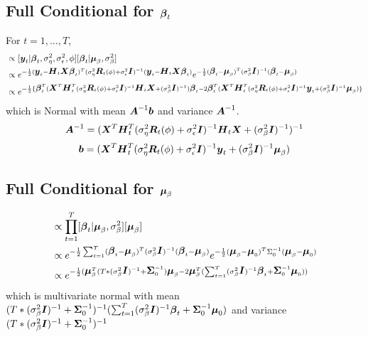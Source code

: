 \documentclass[fleqn]{article}
\def\bm#1{\mbox{\boldmath $#1$}}
\begin{document}
\subsection{Full Conditional for $\bm{\beta}_t$}
%
For $t = 1, \ldots, T$,
\begin{align*}
[\bm{\beta}_t | \cdot] & \propto [\bm{y}_t | \bm{\beta}_t, \sigma^2_\eta, \sigma^2_\epsilon, \phi] [\bm{\beta}_t | \bm{\mu}_\beta, \sigma^2_\beta]\\
%
& \propto e^{ - \frac{1} {2} (\bm{y}_t - \bm{H}_t \bm{X} \bm{\beta}_t)^T (\sigma^2_\eta \bm{R}_t(\phi) + \sigma^2_\epsilon \bm{I})^{ - 1} (\bm{y}_t - \bm{H}_t \bm{X} \bm{\beta}_t)} e^{ - \frac{1} {2} (\bm{\beta}_t - \bm{\mu}_\beta)^T (\sigma^2_{\beta} \bm{I})^{ - 1} (\bm{\beta}_t - \bm{\mu}_\beta)}\\
%
& \propto e^{ - \frac{1} {2} \{\bm{\beta}_t^T (\bm{X}^T \bm{H}_t^T (\sigma^2_\eta \bm{R}_t(\phi) + \sigma^2_\epsilon \bm{I})^{ - 1} \bm{H}_t \bm{X} + (\sigma^2_{\beta} \bm{I})^{ - 1}) \bm{\beta}_t - 2 \bm{\beta}_t^T (\bm{X}^T \bm{H}_t^T (\sigma^2_\eta \bm{R}_t(\phi) + \sigma^2_\epsilon \bm{I})^{ - 1} \bm{y}_t + (\sigma^2_{\beta} \bm{I})^{ - 1} \bm{\mu}_\beta) \} }
\end{align*}
%
which is Normal with mean $ \bm{A}^{ - 1} \bm{b}$ and variance $\bm{A}^{ - 1}$.
\begin{align*}
  \bm{A}^{ - 1} & = (\bm{X}^T \bm{H}_t^T (\sigma^2_\eta \bm{R}_t(\phi) + \sigma^2_\epsilon \bm{I})^{ - 1} \bm{H}_t \bm{X} + (\sigma^2_{\beta} \bm{I})^{ - 1})^{ - 1}\\
\end{align*}
\begin{align*}
  \bm{b} & = (\bm{X}^T \bm{H}_t^T (\sigma^2_\eta \bm{R}_t(\phi) + \sigma^2_\epsilon \bm{I})^{ - 1} \bm{y}_t + (\sigma^2_{\beta} \bm{I})^{ - 1} \bm{\mu}_\beta)\\
\end{align*}
%
\subsection{Full Conditional for $\bm{\mu}_\beta$}
%
\begin{align*}
[\bm{\mu}_\beta | \cdot] & \propto \prod_{t = 1}^T [\bm{\beta}_t | \bm{\mu}_\beta, \sigma^2_\beta] [\bm{\mu}_\beta]\\
%
& \propto e^{ - \frac{1} {2} \sum_{t = 1}^T (\bm{\beta}_t - \bm{\mu}_\beta)^T (\sigma^2_{\beta} \bm{I})^{ - 1} (\bm{\beta}_t - \bm{\mu}_\beta)} e^{ - \frac{1} {2} (\bm{\mu}_\beta - \bm{\mu}_0)^T \Sigma_0^{ - 1} (\bm{\mu}_\beta - \bm{\mu}_0)}\\
%
& \propto e^{ - \frac{1} {2} (
\bm{\mu}_\beta^T (T * (\sigma^2_{\beta} \bm{I})^{ - 1} + \bm{\Sigma}_0^{ - 1}) \bm{\mu}_\beta - 2 \bm{\mu}_\beta^T (\sum_{t = 1}^T (\sigma^2_{\beta} \bm{I})^{ - 1} \bm{\beta}_t + \bm{\Sigma}_0^{ - 1} \bm{\mu}_0) ) }
\end{align*}
%
which is multivariate normal with mean
$(T * (\sigma^2_{\beta} \bm{I})^{ - 1} + \bm{\Sigma}_0^{ - 1})^{ - 1} (\sum_{t = 1}^T (\sigma^2_{\beta} \bm{I})^{ - 1} \bm{\beta}_t + \bm{\Sigma}_0^{ - 1} \bm{\mu}_0)$ and variance $(T * (\sigma^2_{\beta} \bm{I})^{ - 1} + \bm{\Sigma}_0^{ - 1})^{ - 1}$
%
\end{document}
